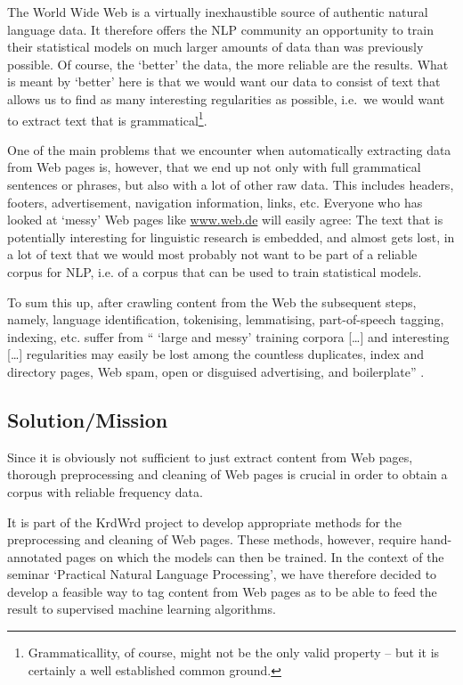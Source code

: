 \documentclass[12pt,a4paper]{article}
\begin{document}
The World Wide Web is a virtually inexhaustible source of authentic natural language data. It therefore offers the NLP community an opportunity to train their statistical models on much larger amounts of data than was previously possible. 
Of course, the `better' the data, the more reliable are the results. 
What is meant by `better' here is that we would want our data to consist of text that allows us to find as many interesting regularities as possible, i.e.~we would want to extract text that is grammatical\footnote{Grammaticallity, of course, might not be the only valid property -- but it is certainly a well established common ground.}.

One of the main problems that we encounter when automatically extracting data from Web pages is, however, that we end up not only with full grammatical sentences or phrases, but also with a lot of other raw data. 
This includes headers, footers, advertisement, navigation information, links, etc. 
Everyone who has looked at `messy' Web pages like \url{www.web.de} will easily agree: The text that is potentially interesting for linguistic research is embedded, and almost gets lost, in a lot of text that we would most probably not want to be part of a reliable corpus for NLP, i.e. of a corpus that can be used to train statistical models. 

To sum this up, after crawling content from the Web the subsequent steps, namely, language identification, tokenising, lemmatising, part-of-speech tagging, indexing, etc. suffer from `` `large and messy' training corpora [\ldots] and interesting [\ldots] regularities may easily be lost among the countless duplicates, index and directory pages, Web spam, open or disguised advertising, and boilerplate'' \cite{Evert2008}.


\subsection{Solution/Mission}

Since it is obviously not sufficient to just extract content from Web pages, thorough preprocessing and cleaning of Web pages is crucial in order to obtain a corpus with reliable frequency data.

It is part of the KrdWrd project to develop appropriate methods for the preprocessing and cleaning of Web pages. 
These methods, however, require hand-annotated pages on which the models can then be trained. 
In the context of the seminar `Practical Natural Language Processing', we have therefore decided to develop a feasible way to tag content from Web pages as to be able to feed the result to supervised machine learning algorithms.
\end{document}
